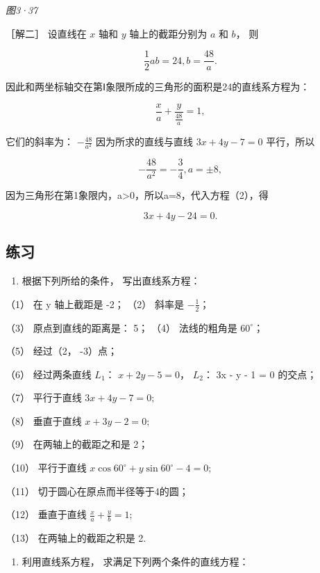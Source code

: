 \emph{图3·37}

［解二］ 设直线在 \(x\) 轴和 \(y\) 轴上的截距分别为 \(a\) 和 \(b\)， 则

\[
\frac {1}{2} a b = 24, b = \frac {48}{a}.
\]

因此和两坐标轴交在第Ⅰ象限所成的三角形的面积是24的直线系方程为：

\[
\frac {x}{a} + \frac {y}{\frac {48}{a}} = 1, \tag {2}
\]

它们的斜率为： \(-\frac{48}{a^{2}}\) 因为所求的直线与直线
\(3x + 4y - 7 = 0\) 平行，所以

\[
- \frac {48}{a^{2}} = - \frac {3}{4}, a = \pm 8,
\]

因为三角形在第1象限内，a\textgreater0，所以a=8，代入方程（2），得

\[
3 x + 4 y - 24 = 0.
\]

\subsection{练习}\label{ux7ec3ux4e60-5}

\begin{enumerate}
\def\labelenumi{\arabic{enumi}.}
\tightlist
\item
  根据下列所给的条件， 写出直线系方程：
\end{enumerate}

（1） 在 y 轴上截距是 -2； （2） 斜率是 \(-\frac{1}{2}\)；

（3） 原点到直线的距离是： 5； （4） 法线的粗角是 \(60^{\circ}\)；

（5） 经过（2， -3）点；

（6） 经过两条直线 \(L_{1}\)： \(x + 2y - 5 = 0\)， \(L_{2}\)： 3x - y -
1 = 0 的交点；

（7） 平行于直线 \(3x + 4y - 7 = 0;\)

（8） 垂直于直线 \(x + 3y - 2 = 0;\)

（9） 在两轴上的截距之和是 2；

（10） 平行于直线 \(x \cos 60^{\circ} + y \sin 60^{\circ} - 4 = 0;\)

（11） 切于圆心在原点而半径等于4的圆；

（12） 垂直于直线 \(\frac{x}{a} + \frac{y}{b} = 1;\)

（13） 在两轴上的截距之积是 2.

\begin{enumerate}
\def\labelenumi{\arabic{enumi}.}
\setcounter{enumi}{1}
\tightlist
\item
  利用直线系方程， 求满足下列两个条件的直线方程：
\end{enumerate}


